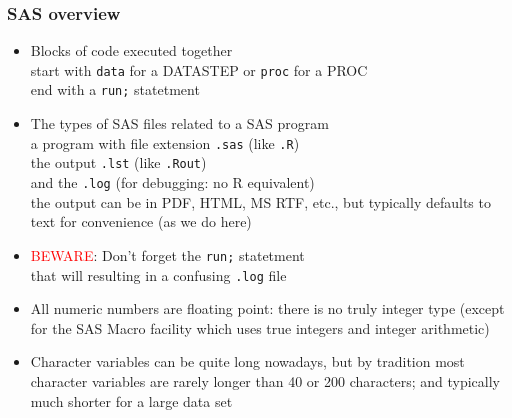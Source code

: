 \documentclass[11pt,pdftex,dvipsnames,usenames,helvetica]{beamer}
\begin{document}
\begin{frame}[fragile]
\frametitle{SAS overview}
\begin{itemize}
\item Blocks of code executed together\\
start with {\tt data} for a DATASTEP or {\tt proc} for a PROC\\
end with a {\tt run;} statetment
\item The types of SAS files related to a SAS program\\
a program with file extension {\tt .sas} (like {\tt .R})\\
the output {\tt .lst}  (like {\tt .Rout})\\ and the {\tt .log}
(for debugging: no R equivalent)\\
the output can be in PDF, HTML, MS RTF, etc.,
but typically defaults to text for convenience 
(as we do here)
\item \textcolor{red}{BEWARE}: Don't forget the {\tt run;} statetment\\
that will resulting in a confusing {\tt .log} file
\item All numeric numbers are floating point: there is no
truly integer type (except for the SAS Macro facility which 
uses true integers and integer arithmetic)
\item Character variables can be quite long nowadays,
but by tradition most character variables are rarely longer than
40 or 200 characters;
and typically much shorter for a large data set
\end{itemize}
\end{frame}
\end{document}
